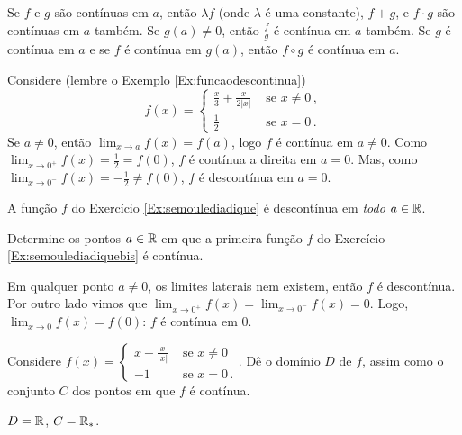 \begin{pro}\label{Prop:continuidadechiante}
Se $f$ e $g$ são contínuas em $a$, então $\lambda f$ (onde $\lambda$ é uma constante),
$f+g$, e $f\cdot g$ 
são contínuas em $a$ também. 
Se $g(a)\neq 0$, então $\frac{f}{g}$ é contínua em $a$ também.
Se $g$ é contínua em $a$ e se $f$ é contínua em $g(a)$, então $f\circ g$ é contínua em
$a$.
\end{pro}


\begin{ex}
Considere (lembre o  Exemplo \ref{Ex:funcaodescontinua})
$$f(x)=
\begin{cases}
\tfrac{x}{3}+\frac{x}{2|x|}&\text{ se }x\neq 0\,,\\
\tfrac12&\text{ se }x=0\,.
\end{cases}
$$
Se $a\neq 0$, então $\lim_{x\to a}f(x)=f(a)$, logo $f$ é contínua em  $a\neq 0$. 
Como $\lim_{x\to 0^+}f(x)=\tfrac12=f(0)$, $f$ é contínua a direita em $a=0$. Mas, como
$\lim_{x\to 0^-}f(x)=-\tfrac12\neq f(0)$, $f$ é descontínua em $a=0$.
\end{ex}

\begin{ex}
A função $f$ do Exercício \ref{Ex:semoulediadique} é descontínua em \emph{todo} $a\in
\mathbb{R}$.
\end{ex}


\begin{exo}
Determine os pontos $a\in \mathbb{R}$ em que a primeira função $f$ do Exercício
\ref{Ex:semoulediadiquebis} é contínua.
\begin{sol}
Em qualquer ponto $a\neq 0$, os limites laterais nem existem, então
$f$ é descontínua. Por outro lado vimos que $\lim_{x\to
0^+}f(x)=\lim_{x\to 0^- }f(x)=0$. Logo, 
$\lim_{x\to 0}f(x)=f(0)$: $f$ é contínua em $0$.
\end{sol}
\end{exo}

\begin{exo}
Considere $f(x)=
\begin{cases}
x-\frac{x}{|x|}&\text{ se }x\neq 0\\
-1&\text{ se }x=0\,.
\end{cases}$.
Dê o domínio  $D$ de $f$, assim como o conjunto $C$ dos pontos em que $f$ é
contínua.
\begin{sol}
$D=\mathbb{R}$, $C=\mathbb{R}_*$.
\end{sol}
\end{exo}

